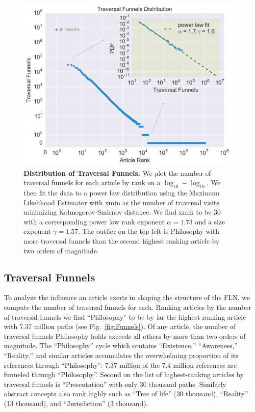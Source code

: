 \documentclass[pre,twocolumn,twoside,superscriptaddress,floatfix, aps, 10pt]{revtex4-1}
\begin{document}
\begin{figure}[tp!]
  \includegraphics[width=\columnwidth]{graphics/funnels_distribution.png}
  \caption{
    \textbf{Distribution of Traversal Funnels.}
    We plot the number of traversal funnels for each article by rank on a $\log_{10}-\log_{10}$. We then fit the data to a power law 
    distribution using the Maximum Likelihood Estimator with xmin as the number of traversal visits minimizing Kolmogorov-Smirnov distance. We find xmin to be 30 with a corresponding power law rank exponent $\alpha = 1.73$ and a size exponent $\gamma = 1.57$.
    The outlier on the top left is Philosophy with more traversal funnels than the second highest ranking article by two orders of magnitude.
}
  \label{fig:Funnels Distribution}
\end{figure}

\subsection{Traversal Funnels}
\label{Traversal Funnels}

To analyze the influence an article exerts in shaping the 
structure of the FLN, we compute the number of traversal funnels for each.
Ranking articles by the number of traversal funnels we find 
``Philosophy'' to be by far the highest ranking article with 
$7.37$ million paths
(see Fig.~\ref{fig:Funnels}).
Of any article, the number of traversal funnels Philosophy holds exceeds 
all others by more than two orders of magnitude.
The ``Philosophy'' cycle which contains ``Existence,'' ``Awareness,'' ``Reality,'' 
and similar articles accumulates the overwhelming proportion of its 
references through ``Philosophy'': $7.37$ million of the $7.4$ million references
are funneled through ``Philosophy''.
Second on the list of highest-ranking articles by traversal funnels is 
``Presentation'' with only $30$ thousand paths. Similarly abstract 
concepts also rank highly such as ``Tree of life'' (30 thousand), 
``Reality'' (13 thousand), and ``Jurisdiction'' (3 thousand).
\end{document}
